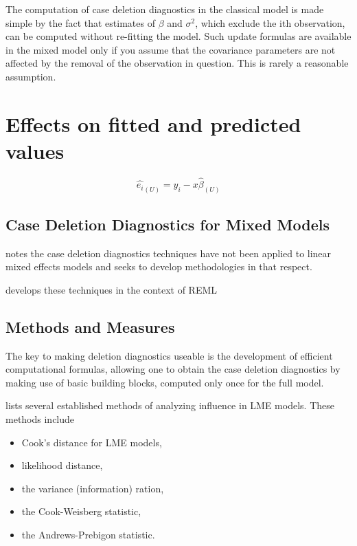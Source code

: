 \documentclass[12pt, a4paper]{report}
\theoremstyle{plain}
\theoremstyle{definition}
\theoremstyle{remark}
\begin{document}
The computation of case deletion diagnostics in the classical model is made simple by the fact that estimates of $\beta$ and $\sigma^2$, which exclude the ith observation, can be computed without re-fitting the model. Such update formulas are available in the mixed model only if you assume that the covariance parameters are not affected by the removal of the observation in question. This is rarely a reasonable assumption.

\section{Effects on fitted and predicted values}
\begin{equation}
\hat{e_{i}}_{(U)} = y_{i} - x\hat{\beta}_{(U)}
\end{equation}

\subsection{Case Deletion Diagnostics for Mixed Models}

\citet{Christiansen} notes the case deletion diagnostics techniques have not been applied to linear mixed effects models and seeks to develop methodologies in that respect.

\citet{Christiansen} develops these techniques in the context of REML

\subsection{Methods and Measures}
The key to making deletion diagnostics useable is the development of efficient computational formulas, allowing one to obtain the  case deletion diagnostics by making use of basic building blocks, computed only once for the full model.

\citet{Zewotir} lists several established methods of analyzing influence in LME models. These methods include \begin{itemize}
\item Cook's distance for LME models,
\item {} likelihood distance,
\item the variance (information) ration,
\item the  Cook-Weisberg statistic,
\item the  Andrews-Prebigon statistic.
\end{itemize}
\end{document}
